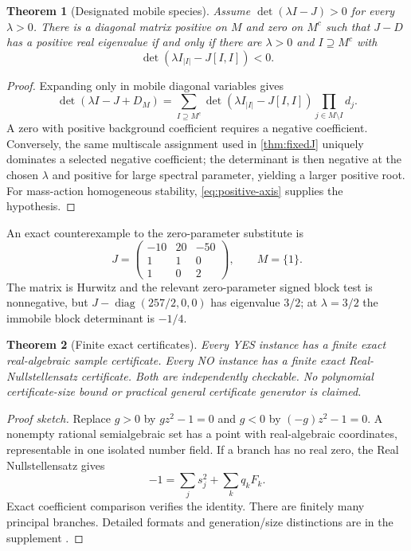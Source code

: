 \documentclass[11pt]{article}
\newtheorem{theorem}{Theorem}[section]
\theoremstyle{definition}
\newcommand{\diag}{\operatorname{diag}}
\begin{document}
\begin{theorem}[Designated mobile species]
\label{thm:mobile}
Assume $\det(\lambda I-J)>0$ for every $\lambda>0$.  There is a diagonal
matrix positive on $M$ and zero on $M^c$ such that $J-D$ has a positive real
eigenvalue if and only if there are $\lambda>0$ and
$I\supseteq M^c$ with
\[
 \det(\lambda I_{|I|}-J[I,I])<0.
\]
\end{theorem}

\begin{proof}
Expanding only in mobile diagonal variables gives
\[
 \det(\lambda I-J+D_M)
 =\sum_{I\supseteq M^c}
 \det(\lambda I_{|I|}-J[I,I])
 \prod_{j\in M\setminus I}d_j.
\]
A zero with positive background coefficient requires a negative coefficient.
Conversely, the same multiscale assignment used in \cref{thm:fixedJ} uniquely
dominates a selected negative coefficient; the determinant is then negative
at the chosen $\lambda$ and positive for large spectral parameter, yielding a
larger positive root.  For mass-action homogeneous stability,
\eqref{eq:positive-axis} supplies the hypothesis.
\end{proof}

An exact counterexample to the zero-parameter substitute is
\[
 J=\begin{pmatrix}-10&20&-50\\1&1&0\\1&0&2\end{pmatrix},
 \qquad M=\{1\}.
\]
The matrix is Hurwitz and the relevant zero-parameter signed block test is
nonnegative, but
$J-\diag(257/2,0,0)$ has eigenvalue $3/2$; at $\lambda=3/2$ the immobile block
determinant is $-1/4$.

\begin{theorem}[Finite exact certificates]
\label{thm:certificates}
Every YES instance has a finite exact real-algebraic sample certificate.
Every NO instance has a finite exact Real-Nullstellensatz certificate.  Both
are independently checkable.  No polynomial certificate-size bound or
practical general certificate generator is claimed.
\end{theorem}

\begin{proof}[Proof sketch]
Replace $g>0$ by $gz^2-1=0$ and $g<0$ by $(-g)z^2-1=0$.  A nonempty rational
semialgebraic set has a point with real-algebraic coordinates, representable in
one isolated number field.  If a branch has no real zero, the Real
Nullstellensatz gives
\[
 -1=\sum_j s_j^2+\sum_kq_kF_k.
\]
Exact coefficient comparison verifies the identity.  There are finitely many
principal branches.  Detailed formats and generation/size distinctions are in
the supplement \cite{BochnakCosteRoy1998,BasuPollackRoy2006}.
\end{proof}
\end{document}
